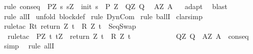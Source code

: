 \begin{isabellebody}
%
\isadelimproof
%
\endisadelimproof
%
\isatagproof
{}\isamarkupfalse%
\ {\isacharparenleft}rule\ conseq\ {\isacharbrackleft}\ P{\isacharprime}{\isacharequal}{\isachardoublequoteopen}{\isasymlambda}Z{\isachardot}\ {\isacharbraceleft}s{\isachardot}\ s{\isacharequal}Z\ {\isasymand}\ init\ s\ {\isasymin}\ P{\isacharprime}\ Z{\isacharbraceright}{\isachardoublequoteclose}\ \ Q{\isacharprime}{\isacharequal}{\isachardoublequoteopen}{\isasymlambda}Z{\isachardot}\ Q{\isachardoublequoteclose}\ \ \isanewline
A{\isacharprime}{\isacharequal}{\isachardoublequoteopen}{\isasymlambda}Z{\isachardot}\ A{\isachardoublequoteclose}{\isacharbrackright}{\isacharparenright}\isanewline
{}\isamarkupfalse%
\ {}\isanewline
{}\isamarkupfalse%
\ adapt\isanewline
{}\isamarkupfalse%
\ \ blast\isanewline
{}\isamarkupfalse%
\ {\isacharparenleft}rule\ allI{\isacharparenright}\isanewline
{}\isamarkupfalse%
\ {\isacharparenleft}unfold\ block{\isacharunderscore}def{\isacharparenright}\isanewline
{}\isamarkupfalse%
\ {\isacharparenleft}rule\ DynCom{\isacharparenright}\isanewline
{}\isamarkupfalse%
\ {\isacharparenleft}rule\ ballI{\isacharparenright}\isanewline
{}\isamarkupfalse%
\ clarsimp\isanewline
{}\isamarkupfalse%
\ {\isacharparenleft}rule{\isacharunderscore}tac\ R{\isacharequal}{\isachardoublequoteopen}{\isacharbraceleft}t{\isachardot}\ return\ Z\ t\ {\isasymin}\ R\ Z\ t{\isacharbraceright}{\isachardoublequoteclose}\ \ SeqSwap\ {\isacharparenright}\isanewline
{}\isamarkupfalse%
\ \ {\isacharparenleft}rule{\isacharunderscore}tac\ \ P{\isacharprime}{\isacharequal}{\isachardoublequoteopen}{\isasymlambda}Z{\isacharprime}{\isachardot}\ {\isacharbraceleft}t{\isachardot}\ t{\isacharequal}Z{\isacharprime}\ {\isasymand}\ return\ Z\ t\ {\isasymin}\ R\ Z\ t{\isacharbraceright}{\isachardoublequoteclose}\ \ \isanewline
\ \ \ \ \ \ \ \ \ \ Q{\isacharprime}{\isacharequal}{\isachardoublequoteopen}{\isasymlambda}Z{\isacharprime}{\isachardot}\ Q{\isachardoublequoteclose}\ \ A{\isacharprime}{\isacharequal}{\isachardoublequoteopen}{\isasymlambda}Z{\isacharprime}{\isachardot}\ A{\isachardoublequoteclose}\ \ conseq{\isacharparenright}\isanewline
{}\isamarkupfalse%
\ {}\ \isamarkupfalse%
\ simp\isanewline
{}\isamarkupfalse%
\ \ {\isacharparenleft}rule\ allI{\isacharparenright}\isanewline

\end{isabellebody}
